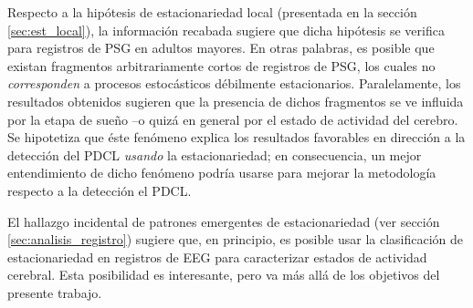 Respecto a la hipótesis de estacionariedad local (presentada en la sección \ref{sec:est_local}), la información recabada sugiere que dicha hipótesis se verifica para registros de PSG en adultos mayores.
%
En otras palabras, es posible que existan fragmentos arbitrariamente cortos de registros de PSG, los cuales no \textit{corresponden} a procesos estocásticos débilmente estacionarios.
%
Paralelamente, los resultados obtenidos sugieren que la presencia de dichos fragmentos se ve influida por la etapa de sueño --o quizá en general por el estado de actividad del cerebro.
%
Se hipotetiza que éste fenómeno explica los resultados {favorables} en dirección a la detección del PDCL \textit{usando} la estacionariedad; en consecuencia, un mejor entendimiento de dicho fenómeno podría usarse para mejorar la metodología respecto a la detección el PDCL.
%



El hallazgo incidental de patrones emergentes de estacionariedad (ver sección \ref{sec:analisis_registro}) sugiere que, en principio, es posible usar la clasificación de estacionariedad en registros de EEG para caracterizar estados de actividad cerebral. 
%
%
Esta posibilidad es interesante, pero va más allá de los objetivos del presente trabajo.
 


